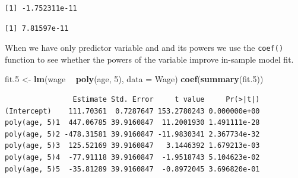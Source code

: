\documentclass[]{article}
\newenvironment{Shaded}{\begin{snugshade}}{\end{snugshade}}
\newcommand{\CommentTok}[1]{\textcolor[rgb]{0.56,0.35,0.01}{\textit{#1}}}
\newcommand{\DataTypeTok}[1]{\textcolor[rgb]{0.13,0.29,0.53}{#1}}
\newcommand{\DecValTok}[1]{\textcolor[rgb]{0.00,0.00,0.81}{#1}}
\newcommand{\FloatTok}[1]{\textcolor[rgb]{0.00,0.00,0.81}{#1}}
\newcommand{\KeywordTok}[1]{\textcolor[rgb]{0.13,0.29,0.53}{\textbf{#1}}}
\newcommand{\NormalTok}[1]{#1}
\newcommand{\OperatorTok}[1]{\textcolor[rgb]{0.81,0.36,0.00}{\textbf{#1}}}
\newcommand{\OtherTok}[1]{\textcolor[rgb]{0.56,0.35,0.01}{#1}}
\newcommand{\StringTok}[1]{\textcolor[rgb]{0.31,0.60,0.02}{#1}}
\begin{document}
\begin{Shaded}
\end{Shaded}

\begin{verbatim}
[1] -1.752311e-11
\end{verbatim}

\begin{Shaded}
\end{Shaded}

\begin{verbatim}
[1] 7.81597e-11
\end{verbatim}

When we have only predictor variable and and its powers we use the \texttt{coef()} function to see whether the powers of the variable improve in-sample model fit.

\begin{Shaded}
\begin{Highlighting}[]
\NormalTok{fit}\FloatTok{.5}\NormalTok{ <-}\StringTok{ }\KeywordTok{lm}\NormalTok{(wage }\OperatorTok{~}\StringTok{ }\KeywordTok{poly}\NormalTok{(age, }\DecValTok{5}\NormalTok{), }\DataTypeTok{data =}\NormalTok{ Wage)}
\KeywordTok{coef}\NormalTok{(}\KeywordTok{summary}\NormalTok{(fit}\FloatTok{.5}\NormalTok{))}
\end{Highlighting}
\end{Shaded}

\begin{verbatim}
                Estimate Std. Error     t value     Pr(>|t|)
(Intercept)    111.70361  0.7287647 153.2780243 0.000000e+00
poly(age, 5)1  447.06785 39.9160847  11.2001930 1.491111e-28
poly(age, 5)2 -478.31581 39.9160847 -11.9830341 2.367734e-32
poly(age, 5)3  125.52169 39.9160847   3.1446392 1.679213e-03
poly(age, 5)4  -77.91118 39.9160847  -1.9518743 5.104623e-02
poly(age, 5)5  -35.81289 39.9160847  -0.8972045 3.696820e-01
\end{verbatim}
\end{document}
